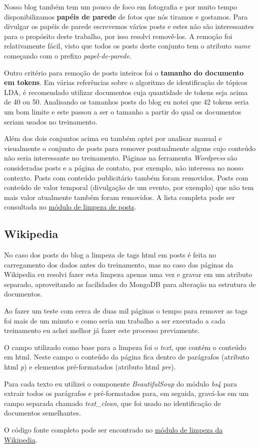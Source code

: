 Nosso blog também tem um pouco de foco em fotografia e por muito tempo disponibilizamos \textbf{papéis de parede} de fotos que nós tiramos e gostamos. 
Para divulgar os papéis de parede escrevemos vários posts e estes não são interessantes para o propósito deste trabalho, por isso resolvi removê-los.
A remoção foi relativamente fácil, visto que todos os posts deste conjunto tem o atributo \textit{name} começando com o prefixo \textit{papel-de-parede}.

Outro critério para remoção de posts inteiros foi o \textbf{tamanho do documento em tokens}. Em várias referências sobre o algoritmo de identificação 
de tópicos LDA, é recomendado utilizar documentos cuja quantidade de tokens seja acima de 40 ou 50. Analisando os tamanhos posts do blog eu notei 
que 42 tokens seria um bom limite e este passou a ser o tamanho a partir do qual os documentos seriam usados no treinamento.

Além dos dois conjuntos acima eu também optei por analisar manual e visualmente o conjunto de posts para remover pontualmente alguns cujo conteúdo 
não seria interessante no treinamento. Páginas na ferramenta \textit{Wordpress} são consideradas posts e a página de contato, por exemplo, 
não interessa no nosso contexto. Posts com conteúdo publicitário também foram removidos. Posts com conteúdo de valor temporal (divulgação de um 
evento, por exemplo) que não tem mais valor atualmente também foram removidos. A lista completa pode ser consultada no 
\href{https://github.com/heldergr/tcc-pucmg-2/blob/main/src/python/notebooks/limpeza/limpeza_posts.py}{módulo de limpeza de posts}.

\subsection{Wikipedia}

No caso dos posts do blog a limpeza de tags html em posts é feita no carregamento dos dados antes do treinamento, mas no caso das páginas da 
Wikipedia eu resolvi fazer esta limpeza apenas uma vez e gravar em um atributo separado, aproveitando as facilidades do MongoDB para alteração 
na estrutura de documentos.

Ao fazer um teste com cerca de duas mil páginas o tempo para remover as tags foi mais de um minuto e como seria um trabalho a ser executado a 
cada treinamento eu achei melhor já fazer este processo previamente.

O campo utilizado como base para a limpeza foi o \textit{text}, que contém o conteúdo em html. Neste campo o conteúdo da página fica dentro de 
parágrafos (atributo html \textit{p}) e elementos pré-formatados (atributo html \textit{pre}).

Para cada texto eu utilizei o componente \textit{BeautifulSoup} do módulo \textit{bs4} para extrair todos os parágrafos e pré-formatados para, 
em seguida, gravá-los em um campo separada chamado \textit{text\_clean}, que foi usado no identificação de documentos semelhantes.

O código fonte completo pode ser encontrado no 
\href{https://github.com/heldergr/tcc-pucmg-2/blob/main/src/python/notebooks/limpeza/limpeza_posts.py}{módulo de limpeza da Wikipedia}.
